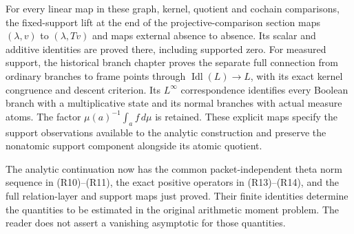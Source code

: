 For every linear map in these graph, kernel, quotient and
cochain comparisons, the fixed-support lift at the end of the
projective-comparison section maps \((\lambda,v)\) to
\((\lambda,Tv)\) and maps external absence to absence.
Its scalar and additive identities are proved there, including
supported zero.  For measured support, the historical branch
chapter proves the separate full connection from ordinary branches
to frame points through \(\operatorname{Idl}(L)\to L\),
with its exact kernel congruence and descent criterion.  Its
\(L^\infty\) correspondence identifies every Boolean branch
with a multiplicative state and its normal branches with actual
measure atoms.  The factor \(\mu(a)^{-1}\int_a f\,d\mu\)
is retained.  These explicit maps specify the support observations
available to the analytic construction and preserve the nonatomic
support component alongside its atomic quotient.

The analytic continuation now has the common packet-independent
theta norm sequence in (R10)--(R11), the exact positive operators
in (R13)--(R14), and the full relation-layer and support maps just
proved.  Their finite identities determine the quantities to be
estimated in the original arithmetic moment problem.  The reader
does not assert a vanishing asymptotic for those quantities.

